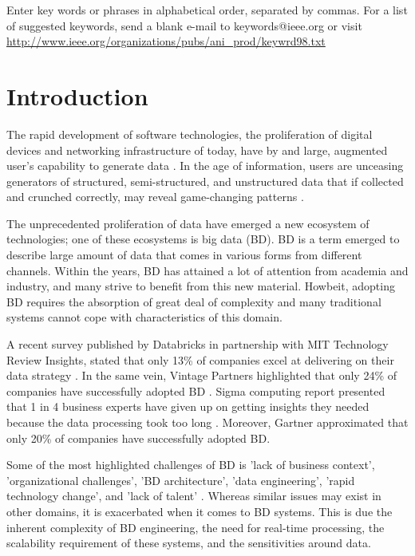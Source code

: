 \documentclass{ieeeaccess}
\begin{document}
\begin{keywords}
Enter key words or phrases in alphabetical 
order, separated by commas. For a list of suggested keywords, send a blank 
e-mail to keywords@ieee.org or visit \underline
{http://www.ieee.org/organizations/pubs/ani\_prod/keywrd98.txt}
\end{keywords}

\titlepgskip=-15pt

\maketitle

\section{Introduction}

The rapid development of software technologies, the proliferation of digital devices and networking infrastructure of today, have by and large, augmented user’s capability to generate data \cite{AtaeiSecurity}. In the age of information, users are unceasing generators of structured, semi-structured, and unstructured data that if collected and crunched correctly, may reveal game-changing patterns \cite{AtaeiACIS}.

The unprecedented proliferation of data have emerged a new ecosystem of technologies; one of these ecosystems is big data (BD)\cite{AtaeiHype}. BD is a term emerged to describe large amount of data that comes in various forms from different channels. Within the years, BD has attained a lot of attention from academia and industry, and many strive to benefit from this new material. Howbeit, adopting BD requires the absorption of great deal of complexity and many traditional systems cannot cope with characteristics of this domain. 

A recent survey published by Databricks in partnership with MIT Technology Review Insights, stated that only 13\% of companies excel at delivering on their data strategy \cite{DataBricks}. In the same vein, Vintage Partners highlighted that only 24\% of companies have successfully adopted BD \cite{NewVantageSurvey}. Sigma computing report presented that 1 in 4 business experts have given up on getting insights they needed because the data processing took too long \cite{SigmaSurvey}. Moreover, Gartner approximated that only 20\% of companies have successfully adopted BD. 

Some of the most highlighted challenges of BD is 'lack of business context', 'organizational challenges', 'BD architecture', 'data engineering', 'rapid technology change', and 'lack of talent' \cite{AtaeiBigDataEnvirons}. Whereas similar issues may exist in other domains, it is exacerbated when it comes to BD systems. This is due the inherent complexity of BD engineering, the need for real-time processing, the scalability requirement of these systems, and the sensitivities around data.
\end{document}
